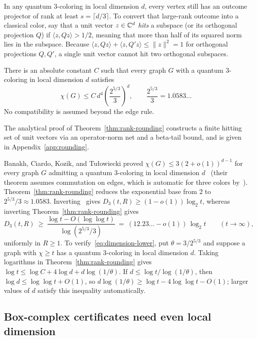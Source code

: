 In any quantum $3$-coloring in local dimension $d$, every vertex still has an outcome projector of rank at least $s=\lceil d/3\rceil$. To convert that large-rank outcome into a classical color, say that a unit vector $z\in\mathbb C^d$ \emph{hits} a subspace (or its orthogonal projection $Q$) if $\langle z,Qz\rangle>1/2$, meaning that more than half of its squared norm lies in the subspace. Because $\langle z,Qz\rangle+\langle z,Q'z\rangle\le\|z\|^2=1$ for orthogonal projections $Q,Q'$, a single unit vector cannot hit two orthogonal subspaces.

\begin{theorem}\label{thm:rank-rounding}
There is an absolute constant $C$ such that every graph $G$ with a quantum $3$-coloring in local dimension $d$ satisfies
\[
 \chi(G)\le C\,d^4\left(\frac{2^{5/3}}{3}\right)^d,\qquad \frac{2^{5/3}}{3}=1.0583\ldots
\]
No compatibility is assumed beyond the edge rule.
\end{theorem}

The analytical proof of Theorem~\ref{thm:rank-rounding} constructs a finite hitting set of unit vectors via an operator-norm net and a beta-tail bound, and is given in Appendix~\ref{app:rounding}.

Banakh, Ciardo, Kozik, and Tu{\l}owiecki proved $\chi(G)\le 3(2+o(1))^{d-1}$ for every graph $G$ admitting a quantum $3$-coloring in local dimension $d$~\cite[Theorem~29]{BCKT} (their theorem assumes commutation on edges, which is automatic for three colors by~\cite[Lemma~2]{Ji}). Theorem~\ref{thm:rank-rounding} reduces the exponential base from $2$ to $2^{5/3}/3\approx1.0583$. Inverting~\cite[Theorem~29]{BCKT} gives $D_3(t,R)\ge(1-o(1))\log_2 t$, whereas inverting Theorem~\ref{thm:rank-rounding} gives
\begin{equation}\label{eq:dimension-lower}
 D_3(t,R)\ \ge\ \frac{\log t-O(\log\log t)}{\log(2^{5/3}/3)}
 \ =\ (12.23\ldots-o(1))\,\log_2 t\qquad (t\to\infty),
\end{equation}
uniformly in $R\ge1$. To verify~\eqref{eq:dimension-lower}, put $\theta=3/2^{5/3}$ and suppose a graph with $\chi\ge t$ has a quantum $3$-coloring in local dimension $d$. Taking logarithms in Theorem~\ref{thm:rank-rounding} gives $\log t\le \log C+4\log d+d\log(1/\theta)$. If $d\le\log t/\log(1/\theta)$, then $\log d\le\log\log t+O(1)$, so $d\log(1/\theta)\ge\log t-4\log\log t-O(1)$; larger values of $d$ satisfy this inequality automatically.

\subsection{Box-complex certificates need even local dimension}\label{sec:coexist}

